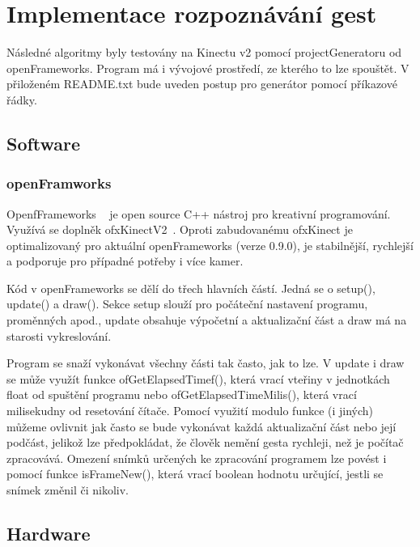\chapter{Implementace rozpoznávání gest}
Následné algoritmy byly testovány na Kinectu v2 pomocí projectGeneratoru od openFrameworks. Program má i vývojové prostředí, ze kterého to lze spouštět. V přiloženém README.txt bude uveden postup pro generátor pomocí příkazové řádky.

\section{Software}
\subsection{openFramworks}
OpenfFrameworks ~\cite{1} je open source C++ nástroj pro kreativní programování.\\
Využívá se doplněk ofxKinectV2~\cite{2}. Oproti zabudovanému ofxKinect je optimalizovaný pro aktuální openFrameworks (verze 0.9.0), je stabilnější, rychlejší a podporuje pro případné potřeby i více kamer.

Kód v openFrameworks se dělí do třech hlavních částí. Jedná se o setup(), update() a draw(). Sekce setup slouží pro počáteční nastavení programu, proměnných apod., update obsahuje výpočetní a aktualizační část a draw má na starosti vykreslování.

Program se snaží vykonávat všechny části tak často, jak to lze. V update i draw se může využít funkce ofGetElapsedTimef(), která vrací vteřiny v jednotkách float od spuštění programu nebo ofGetElapsedTimeMilis(), která vrací milisekudny od resetování čítače. Pomocí využití modulo funkce (i jiných) můžeme ovlivnit jak často se bude vykonávat každá aktualizační část nebo její podčást, jelikož lze předpokládat, že člověk nemění gesta rychleji, než je počítač zpracovává. Omezení snímků určených ke zpracování programem lze povést i pomocí funkce isFrameNew(), která vrací boolean hodnotu určující, jestli se snímek změnil či nikoliv.


\section{Hardware}
